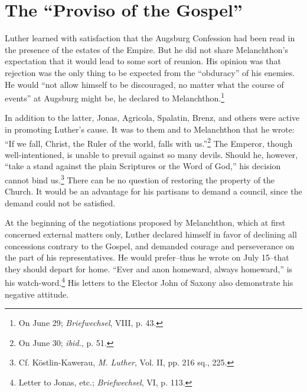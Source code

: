 \section{The “Proviso of the Gospel”}

Luther learned with satisfaction that the Augsburg Confession had
been read in the presence of the estates of the Empire. But he did not
share Melanchthon’s expectation that it would lead to some sort of
reunion. His opinion was that rejection was the only thing to be expected
from the “obduracy” of his enemies. He would “not allow
himself to be discouraged, no matter what the course of events” at
Augsburg might be, he declared to Melanchthon.\footnote{On June 29; \textit{Briefwechsel}, VIII, p. 43.}

In addition to the latter, Jonas, Agricola, Spalatin, Brenz, and
others were active in promoting Luther’s cause. It was to them and to
Melanchthon that he wrote: “If we fall, Christ, the Ruler of the
world, falls with us.”\footnote{On June 30; \textit{ibid.}, p. 51.}
 The Emperor, though well-intentioned, is
unable to prevail against so many devils. Should he, however, “take a
stand against the plain Scriptures or the Word of God,” his decision
cannot bind us.\footnote{Cf. Köstlin-Kawerau, \textit{M. Luther}, Vol. II, pp. 216 sq., 225.}
 There can be no question of restoring the property
of the Church. It would be an advantage for his partisans to demand
a council, since the demand could not be satisfied.

At the beginning of the negotiations proposed by Melanchthon,
which at first concerned external matters only, Luther declared himself
in favor of declining all concessions contrary to the Gospel, and
demanded courage and perseverance on the part of his representatives.
He would prefer--thus he wrote on July 15--that they should depart for
home. “Ever and anon homeward, always homeward,” is his
watch-word.\footnote{Letter to Jonas, etc.; \textit{Briefwechsel}, VI, p. 113.}
 His letters to the Elector John of Saxony also demonstrate
his negative attitude.


